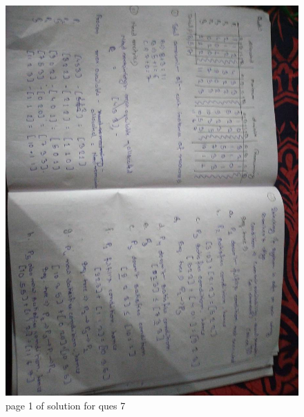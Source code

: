 \documentclass[11pt,a4paper,oneside]{article}
\begin{document}
\begin{figure}[hbt!]
	\centering
	\includegraphics[width=1\textwidth]{images/red_images/q7i1.jpg}
	\caption{page 1 of solution for ques 7}
\end{figure}
\end{document}
